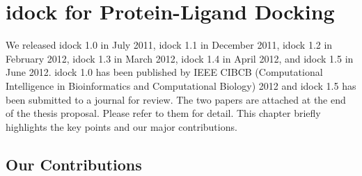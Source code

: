 \chapter{idock for Protein-Ligand Docking}

We released idock 1.0 in July 2011, idock 1.1 in December 2011, idock 1.2 in February 2012, idock 1.3 in March 2012, idock 1.4 in April 2012, and idock 1.5 in June 2012. idock 1.0 has been published by IEEE CIBCB (Computational Intelligence in Bioinformatics and Computational Biology) 2012 and idock 1.5 has been submitted to a journal for review. The two papers are attached at the end of the thesis proposal. Please refer to them for detail. This chapter briefly highlights the key points and our major contributions.

\section{Our Contributions}



\chapterend
